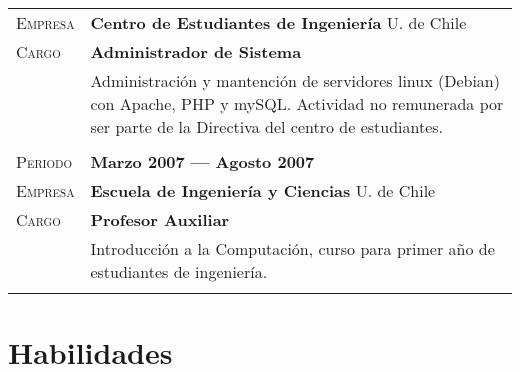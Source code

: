 \documentclass[letterpaper, oneside, final, 12pt]{scrartcl}
\newcommand{\gray}{\rowcolor[gray]{.90}}
\begin{document}
\begin{center}
\begin{tabularx}{0.97\linewidth}{>{\raggedleft\scshape}p{2.5cm}X}
\gray	Empresa		& \textbf{Centro de Estudiantes de Ingenier\'ia} \hfill U. de Chile \\
\gray	Cargo		& \textbf{Administrador de Sistema} \\
					& Administraci\'on y mantenci\'on de servidores linux (Debian) con Apache, PHP y mySQL. Actividad no remunerada por ser parte de la Directiva del centro de estudiantes.\\
					& \\
\gray	Periodo		& \textbf{Marzo 2007 --- Agosto 2007} \\
\gray	Empresa		& \textbf{Escuela de Ingenier\'ia y Ciencias} \hfill U. de Chile \\
\gray	Cargo		& \textbf{Profesor Auxiliar} \\
					& Introducci\'on a la Computaci\'on, curso para primer a\~no de estudiantes de ingenier\'ia. \\
					& \\
\end{tabularx}

\section{Habilidades}


\end{center}
\end{document}
